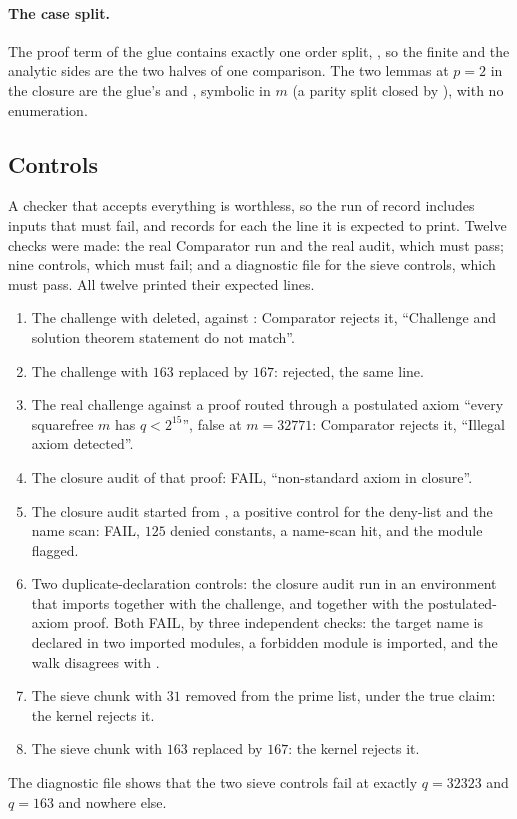 \documentclass[11pt]{article}
\theoremstyle{definition}
\begin{document}
\paragraph{The case split.} The proof term of the glue contains exactly one order split, , so the finite and the analytic sides are the two halves of one comparison. The two lemmas at $p = 2$ in the closure are the glue's  and , symbolic in $m$ (a parity split closed by ), with no enumeration.

\subsection{Controls}\label{sec:controls}

A checker that accepts everything is worthless, so the run of record includes inputs that must fail, and records for each the line it is expected to print. Twelve checks were made: the real Comparator run and the real audit, which must pass; nine controls, which must fail; and a diagnostic file for the sieve controls, which must pass. All twelve printed their expected lines.
\begin{enumerate}[label=(\alph*),nosep]
\item The challenge with  deleted, against : Comparator rejects it, ``Challenge and solution theorem statement do not match''.
\item The challenge with $163$ replaced by $167$: rejected, the same line.
\item The real challenge against a proof routed through a postulated axiom ``every squarefree $m$ has $q < 2^{15}$'', false at $m = 32771$: Comparator rejects it, ``Illegal axiom detected''.
\item The closure audit of that proof: FAIL, ``non-standard axiom in closure''.
\item The closure audit started from , a positive control for the deny-list and the name scan: FAIL, $125$ denied constants, a name-scan hit, and the module  flagged.
\item[(f, g)] Two duplicate-declaration controls: the closure audit run in an environment that imports  together with the challenge, and together with the postulated-axiom proof. Both FAIL, by three independent checks: the target name is declared in two imported modules, a forbidden module is imported, and the walk disagrees with .
\item[(h)] The sieve chunk with $31$ removed from the prime list, under the true claim: the kernel rejects it.
\item[(i)] The sieve chunk with $163$ replaced by $167$: the kernel rejects it.
\end{enumerate}
The diagnostic file shows that the two sieve controls fail at exactly $q = 32323$ and $q = 163$ and nowhere else.
\end{document}
